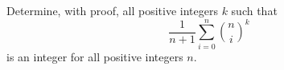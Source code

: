 Determine, with proof, all positive integers $k$ such that$$\frac{1}{n+1} \sum_{i=0}^n \binom{n}{i}^k$$is an integer for all positive integers $n.$